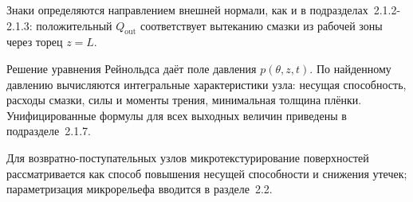 Знаки определяются направлением внешней нормали, как и в подразделах~2.1.2-2.1.3: положительный $Q_{\mathrm{out}}$ соответствует вытеканию смазки из рабочей зоны через торец $z = L$.

Решение уравнения Рейнольдса даёт поле давления $p(\theta, z, t)$. По найденному давлению вычисляются интегральные характеристики узла: несущая способность, расходы смазки, силы и моменты трения, минимальная толщина плёнки. Унифицированные формулы для всех выходных величин приведены в подразделе~2.1.7.

Для возвратно-поступательных узлов микротекстурирование поверхностей рассматривается как способ повышения несущей способности и снижения утечек; параметризация микрорельефа вводится в разделе~2.2.
